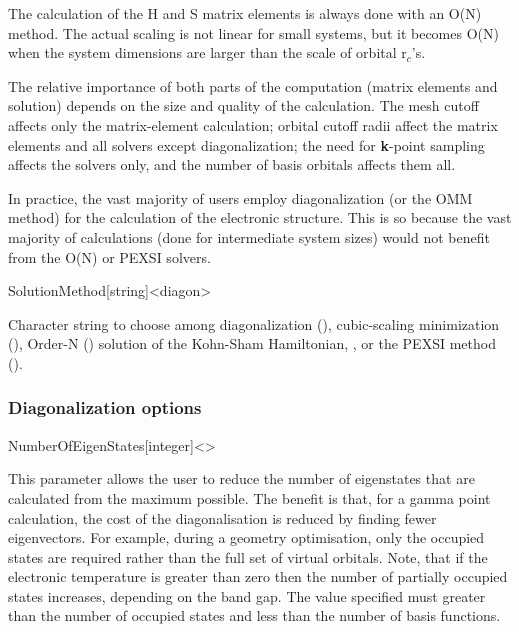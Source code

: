The calculation of the H and S matrix elements is always done with an
O(N) method. The actual scaling is not linear for small systems, but
it becomes O(N) when the system dimensions are larger than the scale
of orbital r$_c$'s.

The relative importance of both parts of the computation (matrix
elements and solution) depends on the size and quality of the
calculation. The mesh cutoff affects only the matrix-element
calculation; orbital cutoff radii affect the matrix elements and all
solvers except diagonalization; the need for \textbf{k}-point sampling
affects the solvers only, and the number of basis orbitals affects
them all.

In practice, the vast majority of users employ diagonalization (or the
OMM method) for the calculation of the electronic structure. This is
so because the vast majority of calculations (done for intermediate
system sizes) would not benefit from the O(N) or PEXSI solvers.

\begin{fdfentry}{SolutionMethod}[string]<diagon>

  Character string to choose among diagonalization (),
  cubic-scaling minimization (), Order-N ()
  solution of the Kohn-Sham Hamiltonian, , or the
  PEXSI method ().
  
\end{fdfentry}


\subsubsection{Diagonalization options}

\begin{fdfentry}{NumberOfEigenStates}[integer]<>

  This parameter allows the user to reduce the number of eigenstates
  that are calculated from the maximum possible. The benefit is that,
  for a gamma point calculation, the cost of the diagonalisation is
  reduced by finding fewer eigenvectors. For example, during a
  geometry optimisation, only the occupied states are required rather
  than the full set of virtual orbitals. Note, that if the electronic
  temperature is greater than zero then the number of partially
  occupied states increases, depending on the band gap.  The value
  specified must greater than the number of occupied states and less
  than the number of basis functions.
  
\end{fdfentry}

